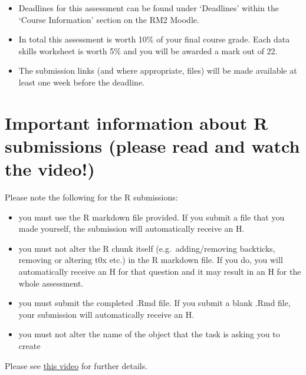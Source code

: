 \documentclass[
  english,
  letterpaper,
  DIV=11,
  numbers=noendperiod]{scrreprt}
\begin{document}
\begin{itemize}
\item
  Deadlines for this assessment can be found under `Deadlines' within
  the `Course Information' section on the RM2 Moodle.
\item
  In total this assessment is worth 10\% of your final course grade.
  Each data skills worksheet is worth 5\% and you will be awarded a mark
  out of 22.
\item
  The submission links (and where appropriate, files) will be made
  available at least one week before the deadline.
\end{itemize}

\section{Important information about R submissions (please read and
watch the
video!)}\label{important-information-about-r-submissions-please-read-and-watch-the-video}

Please note the following for the R submissions:

\begin{itemize}
\item
  you must use the R markdown file provided. If you submit a file that
  you made yourself, the submission will automatically receive an H.
\item
  you must not alter the R chunk itself (e.g.~adding/removing backticks,
  removing or altering t0x etc.) in the R markdown file. If you do, you
  will automatically receive an H for that question and it may result in
  an H for the whole assessment.
\item
  you must submit the completed .Rmd file. If you submit a blank .Rmd
  file, your submission will automatically receive an H.
\item
  you must not alter the name of the object that the task is asking you
  to create
\end{itemize}

Please see
\href{https://uofglasgow.zoom.us/rec/play/kGPffSDx2RT741ZEXDG28KaYFxRDyriV1cO-Tmy0VDcWEDn_2wcCeX853_1t8T9jzrOzEfxMFcgu6yCt.zBN1JhinbBQSRjzG?eagerLoadZvaPages=&accessLevel=meeting&canPlayFromShare=true&from=share_recording_detail&startTime=1725965232000&componentName=rec-play&originRequestUrl=https\%3A\%2F\%2Fuofglasgow.zoom.us\%2Frec\%2Fshare\%2FC7w5EqVNPod9aLKY4SwMtW67PhxNwBaS1GXjvRrOwvVffKGB3HqNler6at6ESWzP.eiXr0xmkpri2n-VX\%3FstartTime\%3D1725965232000}{this
video} for further details.
\end{document}
